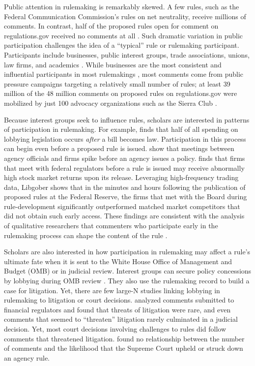 \documentclass[
      12pt,
        ]{article}
\begin{document}
Public attention in rulemaking is remarkably skewed. A few rules, such
as the Federal Communication Commission's rules on net neutrality,
receive millions of comments. In contrast, half of the proposed rules
open for comment on regulations.gov received no comments at all
\citep{LibgoberJOP}. Such dramatic variation in public participation
challenges the idea of a ``typical'' rule or rulemaking participant.
Participants include businesses, public interest groups, trade
associations, unions, law firms, and academics
\citep{CuellarALR2005, YackeeJOP2006}. While businesses are the most
consistent and influential participants in most rulemakings
\citep{YackeeJOP2006, LibgoberJOP}, most comments come from public
pressure campaigns targeting a relatively small number of rules; at
least 39 million of the 48 million comments on proposed rules on
regulations.gov were mobilized by just 100 advocacy organizations such
as the Sierra Club \citep{judgelord2019SPSA}.

Because interest groups seek to influence rules, scholars are interested
in patterns of participation in rulemaking. For example,
\citet{YouJOP2017} finds that half of all spending on lobbying
legislation occurs \emph{after} a bill becomes law. Participation in
this process can begin even before a proposed rule is issued.
\citet{deFigureidoKimICC2004} show that meetings between agency
officials and firms spike before an agency issues a policy.
\citet{LibgoberQJPS} finds that firms that meet with federal regulators
before a rule is issued may receive abnormally high stock market returns
upon its release. Leveraging high-frequency trading data, Libgober shows
that in the minutes and hours following the publication of proposed
rules at the Federal Reserve, the firms that met with the Board during
rule-development significantly outperformed matched market competitors
that did not obtain such early access. These findings are consistent
with the analysis of qualitative researchers that commenters who
participate early in the rulemaking process can shape the content of the
rule \citep{NaughtonJPAM2009}.

Scholars are also interested in how participation in rulemaking may
affect a rule's ultimate fate when it is sent to the White House Office
of Management and Budget (OMB) or in judicial review. Interest groups
can secure policy concessions by lobbying during OMB review
\citep{HaederAPSR2015}. They also use the rulemaking record to build a
case for litigation. Yet, there are few large-N studies linking lobbying
in rulemaking to litigation or court decisions.
\citet{LibgoberRashin2018SPSA} analyzed comments submitted to financial
regulators and found that threats of litigation were rare, and even
comments that seemed to ``threaten'' litigation rarely culminated in a
judicial decision. Yet, most court decisions involving challenges to
rules did follow comments that threatened litigation.
\citet{judgelord2016MPSA} found no relationship between the number of
comments and the likelihood that the Supreme Court upheld or struck down
an agency rule.
\end{document}

